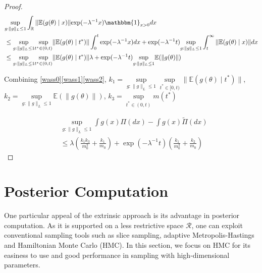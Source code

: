 \documentclass[10pt]{article}
\newcommand{\mc}[1]{\mathcal{#1}}
\DeclareMathOperator{\1}{\mathbbm{1}}
\begin{document}
\begin{proof}[Proof]
	\begin{equation}
		\label{wass2}
	\begin{aligned}
	 & \underset{g:\|g\|_L\le 1}\sup\int_\mathbb{R}  \|\mathbb{E}(g(\theta) \mid x)\| { \exp(- \lambda^{-1} x)}	\mathbbm{1}_{x > 0} d x \\
	&\le \underset{g:\|g\|_L\le 1}\sup\underset{t^*\in (0,t)}\sup \|\mathbb{E}(g(\theta) \mid t^*)\|	
	\int_0^{t} \exp(- \lambda^{-1} x ) dx + \exp(- \lambda^{-1} t ) \underset{g:\|g\|_L\le 1}\sup \int_t^{\infty}   \|\mathbb{E}( g(\theta )\mid x)\| dx \\
&\le \underset{g:\|g\|_L\le 1}\sup\underset{t^*\in (0,t)}\sup \|\mathbb{E}(g(\theta) \mid t^*)\|	\lambda + \exp(- \lambda^{-1} t ) \underset{g:\|g\|_L\le 1} \sup \mathbb{E}(\| g(\theta )\|) \\
	\end{aligned}
\end{equation}

Combining \eqref{wass0}\eqref{wass1}\eqref{wass2}, $k_1=\underset{g:\|g\|_L\le 1}\sup\underset{t^*\in [0,t)}\sup \|\mathbb{E}(g(\theta) \mid t^*)\|$, $k_2=\underset{g:\|g\|_L\le 1} \sup \mathbb{E}(\| g(\theta )\|)$, $k_3= \underset{t^*\in (0,t)}\sup  m(t^{*})$


\begin{equation}
\begin{aligned}
& \underset{g:\|g\|_L\le 1}\sup \int g(x) \Pi(dx) -  \int g(x) \tilde\Pi(dx) \\
	& \le \lambda (\frac{k_1 k_3}{m_0^2} + \frac{k_1}{m_0}) + \exp(- \lambda^{-1} t )(\frac{k_1}{m_0^2} + \frac{k_2}{m_0})
\end{aligned}
\end{equation}


\end{proof}


\section{Posterior Computation}

One particular appeal of the extrinsic approach is its advantage in posterior computation. As it is supported on a less restrictive space $\mc R$, one can exploit conventional sampling tools such as slice sampling, adaptive Metropolis-Hastings and Hamiltonian Monte Carlo (HMC). In this section, we focus on HMC for its easiness to use and good performance in sampling with high-dimensional parameters.
\end{document}
